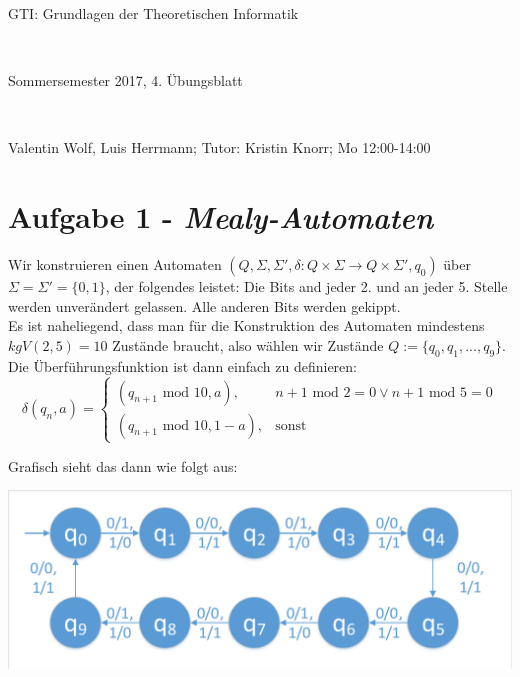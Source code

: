 \documentclass{article}
\begin{document}
	
	\hrulefill
	\begin{center}
		\bfseries %
		\sffamily %
		\begin{huge}
			GTI: Grundlagen der Theoretischen Informatik
		\end{huge}\\
		\begin{Large}
			Sommersemester 2017, 4. Übungsblatt
		\end{Large}\\
		\begin{small}
			Valentin Wolf, Luis Herrmann; Tutor: Kristin Knorr; Mo 12:00-14:00
		\end{small}
		
		\vspace{-10pt}
	\end{center}
	\hrulefill
	
\section*{Aufgabe 1 - \textit{Mealy-Automaten}}
Wir konstruieren einen Automaten $(Q, \Sigma, \Sigma', \delta: Q\times \Sigma \to Q \times \Sigma', q_0)$ über $\Sigma = \Sigma' = \{0,1\}$, der folgendes leistet: Die Bits and jeder 2. und an jeder 5. Stelle werden unverändert gelassen. Alle anderen Bits werden gekippt.\\

Es ist naheliegend, dass man für die Konstruktion des Automaten mindestens $kgV(2,5) = 10$ Zustände braucht, also wählen wir Zustände $Q := \{q_0,q_1,...,q_9\}$. Die Überführungsfunktion ist dann einfach zu definieren:
\begin{equation}
	\delta(q_n,a) = \begin{cases}
	(q_{n+1}\text{ mod } 10,a), &n+1 \text{ mod } 2 = 0 \lor n+1 \text{ mod } 5 = 0\\
	(q_{n+1}\text{ mod } 10,1-a), &\text{sonst}
	\end{cases}
\end{equation}

Grafisch sieht das dann wie folgt aus:

\begin{minipage}{\textwidth}
	\includegraphics[width=\textwidth,page=1,trim={2 2 2 4},clip]{automaten.pdf}
\end{minipage}
\end{document}
